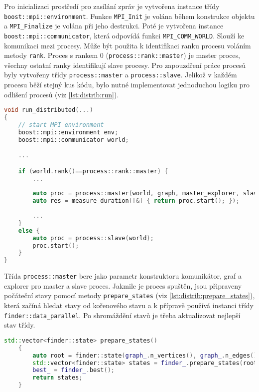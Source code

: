 Pro inicializaci prostředí pro zasílání zpráv je vytvořena instance třídy \texttt{boost::mpi::environment}.
Funkce \texttt{MPI\_Init} je volána během konstrukce objektu a \texttt{MPI\_Finalize} je volána při jeho destrukci.
Poté je vytvořena instance \texttt{boost::mpi::communicator}, která odpovídá funkci \texttt{MPI\_COMM\_WORLD}.
Slouží ke komunikaci mezi procesy.
Může být použita k identifikaci ranku procesu voláním metody \texttt{rank}.
Proces s rankem 0 (\texttt{process::rank::master}) je master proces, všechny ostatní ranky identifikují slave procesy.
Pro zapouzdření práce procesů byly vytvořeny třídy \texttt{process::master} a \texttt{process::slave}.
Jelikož v každém procesu běží stejný kus kódu, bylo nutné implementovat jednoduchou logiku pro odlišení procesů (viz \ref{lst:distrib:run}).

\begin{lstlisting}[language=C++, label={lst:distrib:run}, title={Rozdělení procesů}]
void run_distributed(...)
{
    // start MPI environment
    boost::mpi::environment env;
    boost::mpi::communicator world;

    ...

    if (world.rank()==process::rank::master) {
        ...
        
        auto proc = process::master(world, graph, master_explorer, slave_explorer);
        auto res = measure_duration([&] { return proc.start(); });
        
        ...
    }
    else {
        auto proc = process::slave(world);
        proc.start();
    }
}
\end{lstlisting}

Třída \texttt{process::master} bere jako parametr konstruktoru komunikátor, graf a explorer pro master a slave proces.
Jakmile je proces spuštěn, jsou připraveny počáteční stavy pomocí metody \texttt{prepare\_states} (viz \ref{lst:distrib:prepare_states}), která začíná hledat stavy od kořenového stavu a k přípravě používá instanci třídy \texttt{finder::data\_parallel}.
Po shromáždění stavů je třeba aktualizovat nejlepší stav třídy.

\begin{lstlisting}[language=C++, label={lst:distrib:prepare_states}, title={Metoda pro přípravu počátečních stavů}]
    std::vector<finder::state> prepare_states()
    {
        auto root = finder::state(graph_.n_vertices(), graph_.n_edges());
        std::vector<finder::state> states = finder_.prepare_states(root);
        best_ = finder_.best();
        return states;
    }
\end{lstlisting}

